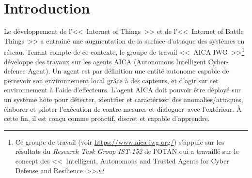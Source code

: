 




\section{Introduction}

Le développement de l'<<~Internet of Things~>> et de l'<<~Internet of Battle Things~>>  a entrainé une augmentation de la surface d'attaque des systèmes en réseau.
Tenant compte de ce contexte, le groupe de travail <<~AICA IWG~>>\footnote{Ce groupe de travail (voir \url{https://www.aica-iwg.org/}) s'appuie sur les résultats du \textit{Research Task Group IST-152} de l'OTAN qui a travaillé sur le concept des <<~Intelligent, Autonomous and Trusted Agents for Cyber Defense and Resilience~>>.} développe des travaux sur les agents AICA (Autonomous Intelligent Cyber-defence Agent).
Un agent est par définition une entité autonome capable de percevoir son environnement local grâce à des capteurs, et d'agir sur cet environnement à l'aide d'effecteurs\cite{russell1995modern}.
L'agent AICA doit pouvoir être déployé sur un système hôte pour détecter, identifier et caractériser des anomalies/attaques, élaborer et piloter l'exécution de contre-mesures et dialoguer avec l'extérieur. À cette fin, il est conçu comme proactif, discret et capable d'apprendre.


